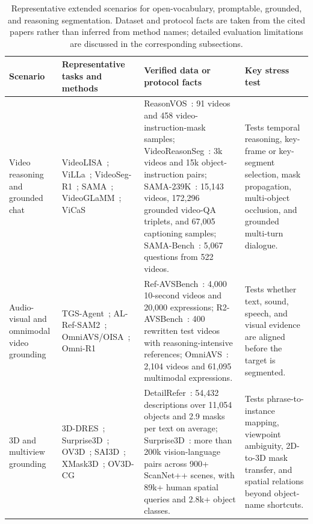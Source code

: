 \begin{table}[t]
\centering
\small
\setlength{\tabcolsep}{4pt}
\renewcommand{\arraystretch}{1.20}
\caption{Representative extended scenarios for open-vocabulary, promptable, grounded, and reasoning segmentation. Dataset and protocol facts are taken from the cited papers rather than inferred from method names; detailed evaluation limitations are discussed in the corresponding subsections.}
\label{tab:extended-scenario-index}
\begin{tabularx}{\textwidth}{>{\raggedright\arraybackslash}p{}>{\raggedright\arraybackslash}X>{\raggedright\arraybackslash}p{}>{\raggedright\arraybackslash}p{}}
\toprule
Scenario & Representative tasks and methods & Verified data or protocol facts & Key stress test \\
\midrule
Video reasoning and grounded chat & VideoLISA~\citep{baiOneTokenSeg2024}; ViLLa~\citep{zhengVillaVideoReasoning2025}; VideoSeg-R1~\citep{xuVideosegr1ReasoningVideo2026}; SAMA~\citep{sunSamaMultiturnReferential2026}; VideoGLaMM~\citep{munasingheVideoglammLargeMultimodal2025}; ViCaS~\citep{atharVicasDatasetCombining2025} & ReasonVOS~\citep{baiOneTokenSeg2024}: 91 videos and 458 video-instruction-mask samples; VideoReasonSeg~\citep{zhengVillaVideoReasoning2025}: 3k videos and 15k object-instruction pairs; SAMA-239K~\citep{sunSamaMultiturnReferential2026}: 15,143 videos, 172,296 grounded video-QA triplets, and 67,005 captioning samples; SAMA-Bench~\citep{sunSamaMultiturnReferential2026}: 5,067 questions from 522 videos. & Tests temporal reasoning, key-frame or key-segment selection, mask propagation, multi-object occlusion, and grounded multi-turn dialogue. \\
Audio-visual and omnimodal video grounding & TGS-Agent~\citep{zhouThinkYouSegment2026}; AL-Ref-SAM2~\citep{huangUnleashingTemporalspatialReasoning2025}; OmniAVS/OISA~\citep{yingOmnimodalExpressionsReasoning2025}; Omni-R1~\citep{zhongOmnir1ReinforcementLearning2026} & Ref-AVSBench~\citep{zhouThinkYouSegment2026}: 4,000 10-second videos and 20,000 expressions; R2-AVSBench~\citep{zhouThinkYouSegment2026}: 400 rewritten test videos with reasoning-intensive references; OmniAVS~\citep{yingOmnimodalExpressionsReasoning2025}: 2,104 videos and 61,095 multimodal expressions. & Tests whether text, sound, speech, and visual evidence are aligned before the target is segmented. \\
3D and multiview grounding & 3D-DRES~\citep{chen3DDRESDetailed3D2026}; Surprise3D~\citep{huangSurprise3dDatasetSpatial2026}; OV3D~\citep{jianglOpenvocabulary3dSemantic2024}; SAI3D~\citep{yyinSai3dSegmentAny2024}; XMask3D~\citep{zwangXmask3dCrossmodalMask2024}; OV3D-CG~\citep{mzhouOV3DCGOpenvocabulary3D2025} & DetailRefer~\citep{chen3DDRESDetailed3D2026}: 54,432 descriptions over 11,054 objects and 2.9 masks per text on average; Surprise3D~\citep{huangSurprise3dDatasetSpatial2026}: more than 200k vision-language pairs across 900+ ScanNet++ scenes, with 89k+ human spatial queries and 2.8k+ object classes. & Tests phrase-to-instance mapping, viewpoint ambiguity, 2D-to-3D mask transfer, and spatial relations beyond object-name shortcuts. \\

\end{tabularx}
\end{table}
